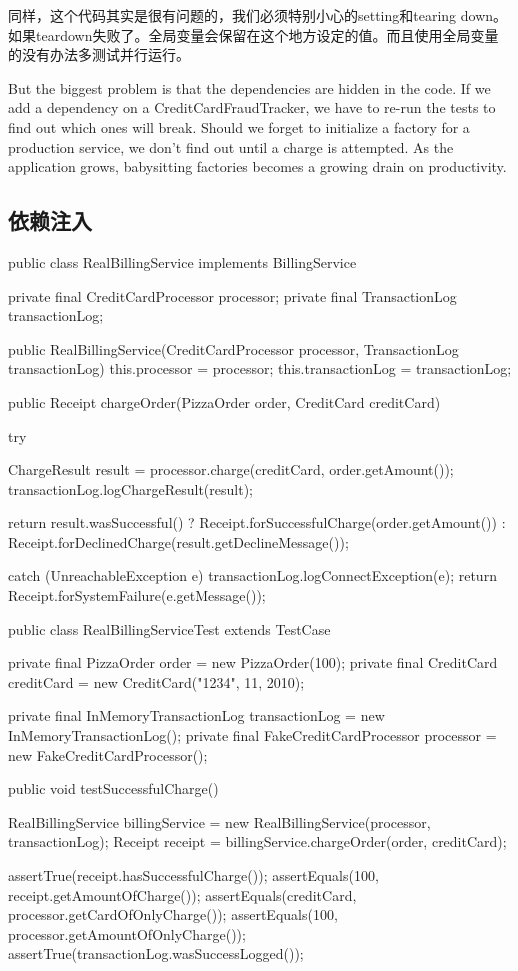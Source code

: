 同样，这个代码其实是很有问题的，我们必须特别小心的setting和tearing down。如果teardown失败了。全局变量会保留在这个地方设定的值。而且使用全局变量的没有办法多测试并行运行。

But the biggest problem is that the dependencies are hidden in the code. If we add a dependency on a CreditCardFraudTracker, we have to re-run the tests to find out which ones will break. Should we forget to initialize a factory for a production service, we don't find out until a charge is attempted. As the application grows, babysitting factories becomes a growing drain on productivity.


\subsection{依赖注入}

\begin{Java}[服务的具体实现不再负责对象的依赖]
public class RealBillingService implements BillingService {
  private final CreditCardProcessor processor;
  private final TransactionLog transactionLog;

  public RealBillingService(CreditCardProcessor processor, 
      TransactionLog transactionLog) {
    this.processor = processor;
    this.transactionLog = transactionLog;
  }

  public Receipt chargeOrder(PizzaOrder order, CreditCard creditCard) {
    try {
      ChargeResult result = processor.charge(creditCard, order.getAmount());
      transactionLog.logChargeResult(result);

      return result.wasSuccessful()
          ? Receipt.forSuccessfulCharge(order.getAmount())
          : Receipt.forDeclinedCharge(result.getDeclineMessage());
     } catch (UnreachableException e) {
      transactionLog.logConnectException(e);
      return Receipt.forSystemFailure(e.getMessage());
    }
  }
}
\end{Java}

\begin{Java}[我们不再需要工厂了]
public class RealBillingServiceTest extends TestCase {

  private final PizzaOrder order = new PizzaOrder(100);
  private final CreditCard creditCard = new CreditCard("1234", 11, 2010);

  private final InMemoryTransactionLog transactionLog = new InMemoryTransactionLog();
  private final FakeCreditCardProcessor processor = new FakeCreditCardProcessor();

  public void testSuccessfulCharge() {
    RealBillingService billingService
        = new RealBillingService(processor, transactionLog);
    Receipt receipt = billingService.chargeOrder(order, creditCard);

    assertTrue(receipt.hasSuccessfulCharge());
    assertEquals(100, receipt.getAmountOfCharge());
    assertEquals(creditCard, processor.getCardOfOnlyCharge());
    assertEquals(100, processor.getAmountOfOnlyCharge());
    assertTrue(transactionLog.wasSuccessLogged());
  }
}
\end{Java}

